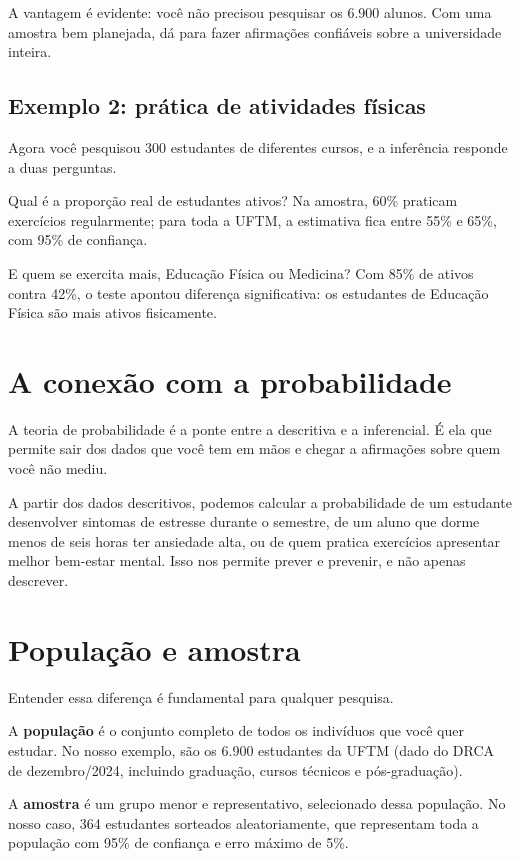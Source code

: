 \documentclass[
]{book}
\begin{document}
A vantagem é evidente: você não precisou pesquisar os 6.900 alunos. Com uma amostra bem planejada, dá para fazer afirmações confiáveis sobre a universidade inteira.

\subsection{Exemplo 2: prática de atividades físicas}\label{exemplo-2-pruxe1tica-de-atividades-fuxedsicas-1}

Agora você pesquisou 300 estudantes de diferentes cursos, e a inferência responde a duas perguntas.

Qual é a proporção real de estudantes ativos? Na amostra, 60\% praticam exercícios regularmente; para toda a UFTM, a estimativa fica entre 55\% e 65\%, com 95\% de confiança.

E quem se exercita mais, Educação Física ou Medicina? Com 85\% de ativos contra 42\%, o teste apontou diferença significativa: os estudantes de Educação Física são mais ativos fisicamente.

\section{A conexão com a probabilidade}\label{a-conexuxe3o-com-a-probabilidade}

A teoria de probabilidade é a ponte entre a descritiva e a inferencial. É ela que permite sair dos dados que você tem em mãos e chegar a afirmações sobre quem você não mediu.

A partir dos dados descritivos, podemos calcular a probabilidade de um estudante desenvolver sintomas de estresse durante o semestre, de um aluno que dorme menos de seis horas ter ansiedade alta, ou de quem pratica exercícios apresentar melhor bem-estar mental. Isso nos permite prever e prevenir, e não apenas descrever.

\section{População e amostra}\label{populauxe7uxe3o-e-amostra}

Entender essa diferença é fundamental para qualquer pesquisa.

A \textbf{população} é o conjunto completo de todos os indivíduos que você quer estudar. No nosso exemplo, são os 6.900 estudantes da UFTM (dado do DRCA de dezembro/2024, incluindo graduação, cursos técnicos e pós-graduação).

A \textbf{amostra} é um grupo menor e representativo, selecionado dessa população. No nosso caso, 364 estudantes sorteados aleatoriamente, que representam toda a população com 95\% de confiança e erro máximo de 5\%.
\end{document}
